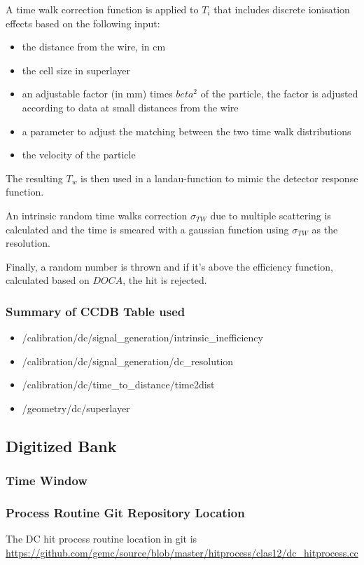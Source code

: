 A time walk correction function is applied to $T_i$ that includes discrete ionisation effects based on the following input:

\begin{itemize}
	\item the distance from the wire, in cm
	\item the cell size in superlayer
	\item an adjustable factor (in mm) times $beta^2$ of the particle, the factor is adjusted according to data at small distances from the wire
	\item a parameter to adjust the matching between the two time walk distributions
	\item the velocity of the particle
\end{itemize}

The resulting $T_w$ is then used in a landau-function to mimic the detector response function.

An intrinsic random time walks correction $\sigma_{TW}$ due to multiple scattering is calculated and the time is smeared with
a gaussian function using $\sigma_{TW}$ as the resolution.

Finally, a random number is thrown and if it's above the efficiency function, calculated based on $DOCA$, the hit is rejected.


\subsubsection{Summary of CCDB Table used}
\begin{itemize}
	\item /calibration/dc/signal\_generation/intrinsic\_inefficiency
	\item /calibration/dc/signal\_generation/dc\_resolution
	\item /calibration/dc/time\_to\_distance/time2dist
	\item /geometry/dc/superlayer
\end{itemize}


\subsection{Digitized Bank}

\subsubsection{Time Window}

\subsubsection{Process Routine Git Repository Location}


The DC hit process routine location in git is \url{https://github.com/gemc/source/blob/master/hitprocess/clas12/dc_hitprocess.cc}
